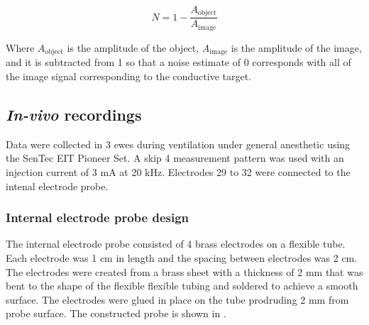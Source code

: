 \begin{equation}
	N = 1-\frac{A_{\text{object}}}{A_{\text{image}}}
\end{equation}

Where $A_{\text{object}}$ is the amplitude of the object, $A_{\text{image}}$ is the amplitude 
of the image, and it is subtracted from 1 so that a noise estimate of 0 corresponds with 
all of the image signal corresponding to the conductive target.

\subsection{\emph{In-vivo} recordings}
Data were collected in 3 ewes during ventilation under 
general anesthetic using the SenTec EIT Pioneer Set.
A skip 4 measurement pattern was used with an injection current 
of 3 mA at 20 kHz. Electrodes 29 to 32 were connected to the intenal
electrode probe. 

\subsubsection{Internal electrode probe design}
The internal electrode probe consisted of 4 brass electrodes on a flexible tube. 
Each electrode was 1 cm in length and the spacing between electrodes was 2 cm. 
The electrodes were created from
a brass sheet with a thickness of 2 mm that was bent to the shape 
of the flexible flexible tubing and soldered to 
achieve a smooth surface. The electrodes were glued in place 
on the tube prodruding 2 mm from probe surface.
The constructed probe is shown in .

